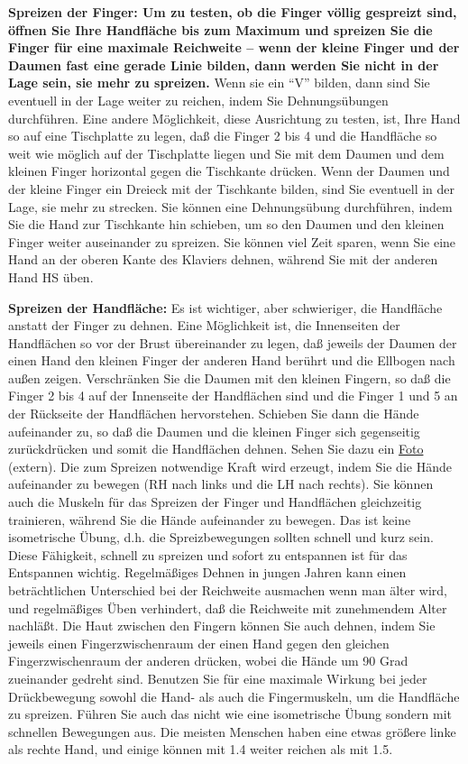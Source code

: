 \textbf{Spreizen der Finger: Um zu testen, ob die Finger völlig gespreizt sind, öffnen Sie Ihre Handfläche bis zum Maximum und spreizen Sie die Finger für eine maximale Reichweite -- wenn der kleine Finger und der Daumen fast eine gerade Linie bilden, dann werden Sie nicht in der Lage sein, sie mehr zu spreizen.}
Wenn sie ein \enquote{V} bilden, dann sind Sie eventuell in der Lage weiter zu reichen, indem Sie Dehnungsübungen durchführen.
Eine andere Möglichkeit, diese Ausrichtung zu testen, ist, Ihre Hand so auf eine Tischplatte zu legen, daß die Finger 2 bis 4 und die Handfläche so weit wie möglich auf der Tischplatte liegen und Sie mit dem Daumen und dem kleinen Finger horizontal gegen die Tischkante drücken.
Wenn der Daumen und der kleine Finger ein Dreieck mit der Tischkante bilden, sind Sie eventuell in der Lage, sie mehr zu strecken.
Sie können eine Dehnungsübung durchführen, indem Sie die Hand zur Tischkante hin schieben, um so den Daumen und den kleinen Finger weiter auseinander zu spreizen.
Sie können viel Zeit sparen, wenn Sie eine Hand an der oberen Kante des Klaviers dehnen, während Sie mit der anderen Hand HS üben.

\textbf{Spreizen der Handfläche:}
Es ist wichtiger, aber schwieriger, die Handfläche anstatt der Finger zu dehnen.
Eine Möglichkeit ist, die Innenseiten der Handflächen so vor der Brust übereinander zu legen, daß jeweils der Daumen der einen Hand den kleinen Finger der anderen Hand berührt und die Ellbogen nach außen zeigen.
Verschränken Sie die Daumen mit den kleinen Fingern, so daß die Finger 2 bis 4 auf der Innenseite der Handflächen sind und die Finger 1 und 5 an der Rückseite der Handflächen hervorstehen.
Schieben Sie dann die Hände aufeinander zu, so daß die Daumen und die kleinen Finger sich gegenseitig zurückdrücken und somit die Handflächen dehnen.
Sehen Sie dazu ein \hyperref[http://www.pianopractice.org/palmstretch.jpg]{Foto} (extern).
Die zum Spreizen notwendige Kraft wird erzeugt, indem Sie die Hände aufeinander zu bewegen (RH nach links und die LH nach rechts).
Sie können auch die Muskeln für das Spreizen der Finger und Handflächen gleichzeitig trainieren, während Sie die Hände aufeinander zu bewegen.
Das ist keine isometrische Übung, d.h. die Spreizbewegungen sollten schnell und kurz sein.
Diese Fähigkeit, schnell zu spreizen und sofort zu entspannen ist für das Entspannen wichtig.
Regelmäßiges Dehnen in jungen Jahren kann einen beträchtlichen Unterschied bei der Reichweite ausmachen wenn man älter wird, und regelmäßiges Üben verhindert, daß die Reichweite mit zunehmendem Alter nachläßt.
Die Haut zwischen den Fingern können Sie auch dehnen, indem Sie jeweils einen Fingerzwischenraum der einen Hand gegen den gleichen Fingerzwischenraum der anderen drücken, wobei die Hände um 90 Grad zueinander gedreht sind.
Benutzen Sie für eine maximale Wirkung bei jeder Drückbewegung sowohl die Hand- als auch die Fingermuskeln, um die Handfläche zu spreizen.
Führen Sie auch das nicht wie eine isometrische Übung sondern mit schnellen Bewegungen aus.
Die meisten Menschen haben eine etwas größere linke als rechte Hand, und einige können mit 1.4 weiter reichen als mit 1.5.

